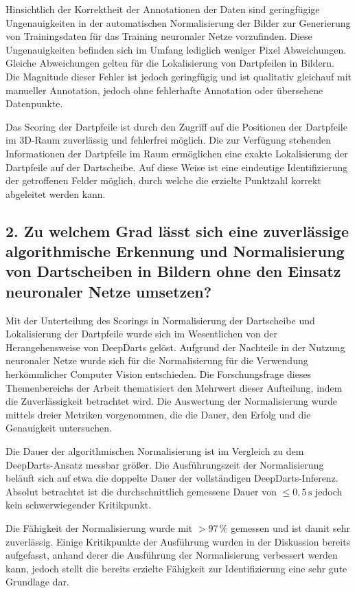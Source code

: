 Hinsichtlich der Korrektheit der Annotationen der Daten sind geringfügige Ungenauigkeiten in der automatischen Normalisierung der Bilder zur Generierung von Trainingsdaten für das Training neuronaler Netze vorzufinden. Diese Ungenauigkeiten befinden sich im Umfang lediglich weniger Pixel Abweichungen. Gleiche Abweichungen gelten für die Lokalisierung von Dartpfeilen in Bildern. Die Magnitude dieser Fehler ist jedoch geringfügig und ist qualitativ gleichauf mit manueller Annotation, jedoch ohne fehlerhafte Annotation oder übersehene Datenpunkte.

Das Scoring der Dartpfeile ist durch den Zugriff auf die Positionen der Dartpfeile im 3D-Raum zuverlässig und fehlerfrei möglich. Die zur Verfügung stehenden Informationen der Dartpfeile im Raum ermöglichen eine exakte Lokalisierung der Dartpfeile auf der Dartscheibe. Auf diese Weise ist eine eindeutige Identifizierung der getroffenen Felder möglich, durch welche die erzielte Punktzahl korrekt abgeleitet werden kann.

\subsection*{2. Zu welchem Grad lässt sich eine zuverlässige algorithmische Erkennung und Normalisierung von Dartscheiben in Bildern ohne den Einsatz neuronaler Netze umsetzen?}

Mit der Unterteilung des Scorings in Normalisierung der Dartscheibe und Lokalisierung der Dartpfeile wurde sich im Wesentlichen von der Herangehensweise von DeepDarts gelöst. Aufgrund der Nachteile in der Nutzung neuronaler Netze wurde sich für die Normalisierung für die Verwendung herkömmlicher Computer Vision entschieden. Die Forschungsfrage dieses Themenbereichs der Arbeit thematisiert den Mehrwert dieser Aufteilung, indem die Zuverlässigkeit betrachtet wird. Die Auswertung der Normalisierung wurde mittels dreier Metriken vorgenommen, die die Dauer, den Erfolg und die Genauigkeit untersuchen.

Die Dauer der algorithmischen Normalisierung ist im Vergleich zu dem DeepDarts-Ansatz messbar größer. Die Ausführungszeit der Normalisierung beläuft sich auf etwa die doppelte Dauer der vollständigen DeepDarts-Inferenz. Absolut betrachtet ist die durchschnittlich gemessene Dauer von $\leq 0,5\,\text{s}$ jedoch kein schwerwiegender Kritikpunkt.

Die Fähigkeit der Normalisierung wurde mit $> 97\,\%$ gemessen und ist damit sehr zuverlässig. Einige Kritikpunkte der Ausführung wurden in der Diskussion bereits aufgefasst, anhand derer die Ausführung der Normalisierung verbessert werden kann, jedoch stellt die bereits erzielte Fähigkeit zur Identifizierung eine sehr gute Grundlage dar.


